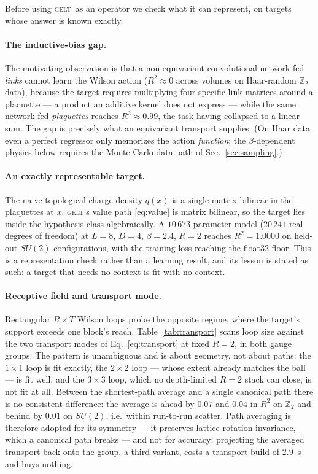 \documentclass[aps,prl,reprint,superscriptaddress,nofootinbib]{revtex4-2}
\newcommand{\Zt}{\mathbb{Z}_2}
\newcommand{\GELT}{\textsc{gelt}}
\begin{document}
Before using \GELT\ as an operator we check what it can represent, on targets
whose answer is known exactly.

\paragraph{The inductive-bias gap.} The motivating observation is that a
non-equivariant convolutional network fed \emph{links} cannot learn the Wilson
action ($R^2\approx0$ across volumes on Haar-random $\Zt$ data), because the
target requires multiplying four specific link matrices around a plaquette --- a
product an additive kernel does not express --- while the same network fed
\emph{plaquettes} reaches $R^2\approx0.99$, the task having collapsed to a linear
sum. The gap is precisely what an equivariant transport supplies. (On Haar data
even a perfect regressor only memorizes the action \emph{function}; the
$\beta$-dependent physics below requires the Monte Carlo data path of
Sec.~\ref{sec:sampling}.)

\paragraph{An exactly representable target.} The naive topological charge
density $q(x)$ is a single matrix bilinear in the plaquettes at $x$. \GELT's
value path \eqref{eq:value} is matrix bilinear, so the target lies inside the
hypothesis class algebraically. A $10\,673$-parameter model ($20\,241$ real
degrees of freedom) at $L=8$, $D=4$, $\beta=2.4$, $R=2$ reaches
$R^2=1.0000$ on held-out $SU(2)$ configurations, with the training loss reaching
the float32 floor. This is a representation check rather than a learning result,
and its lesson is stated as such: a target that needs no context is fit with no
context.

\paragraph{Receptive field and transport mode.} Rectangular $R\times T$ Wilson
loops probe the opposite regime, where the target's support exceeds one block's
reach. Table~\ref{tab:transport} scans loop size against the two transport modes
of Eq.~\eqref{eq:transport} at fixed $R=2$, in both gauge groups. The pattern is
unambiguous and is about geometry, not about paths: the $1\times1$ loop is fit
exactly, the $2\times2$ loop --- whose extent already matches the ball --- is
fit well, and the $3\times3$ loop, which no depth-limited $R=2$ stack can close,
is not fit at all. Between the shortest-path average and a single canonical path
there is no consistent difference: the average is ahead by $0.07$ and $0.04$ in
$R^2$ on $\Zt$ and behind by $0.01$ on $SU(2)$, i.e.\ within run-to-run scatter.
Path averaging is therefore adopted for its symmetry --- it preserves lattice
rotation invariance, which a canonical path breaks --- and not for accuracy;
projecting the averaged transport back onto the group, a third variant, costs a
transport build of $2.9$~s and buys nothing.
\end{document}
